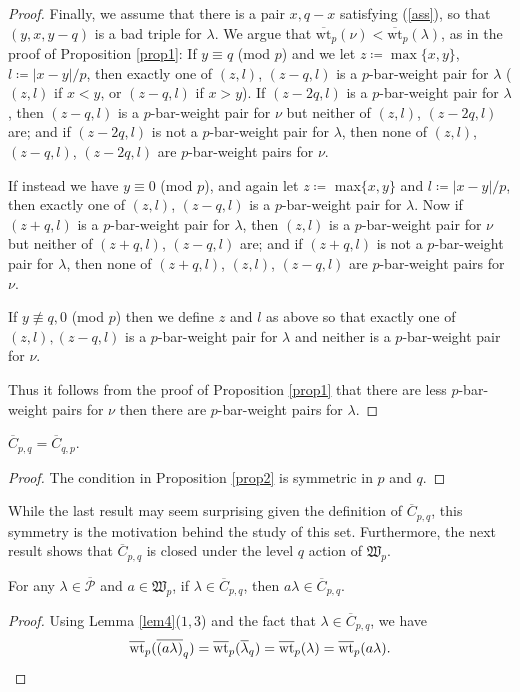 \documentclass[ALCO, Unicode,published]{cedram}
\newcommand*\nicefrac[2]{#1/#2}
\begin{document}
\begin{proof}
Finally, we assume that there is a pair $x,q-x$ satisfying (\ref{ass}), so that $(y,x,y-q)$ is a bad triple for $\lambda$. We argue that $\overline{\text{wt}}_p(\nu)<\overline{\text{wt}}_p(\lambda)$, as in the proof of Proposition \ref{prop1}: \newline
If $y\equiv q$ (mod $p$) and we let $z\coloneqq\max\{x,y\}$, $l\coloneqq\nicefrac{|x-y|}{p}$, then exactly one of $(z,l)$, $(z-q,l)$ is a $p$-bar-weight pair for $\lambda$ ($(z,l)$ if $x<y$, or $(z-q,l)$ if $x>y$). If $(z-2q,l)$ is a $p$-bar-weight pair for $\lambda$, then $(z-q,l)$ is a $p$-bar-weight pair for $\nu$ but neither of $(z,l)$, $(z-2q,l)$ are; and if $(z-2q,l)$ is not a $p$-bar-weight pair for $\lambda$, then none of $(z,l)$, $(z-q,l)$, $(z-2q,l)$ are $p$-bar-weight pairs for $\nu$. 

If instead we have $y\equiv 0$ (mod $p$), and again let $z\coloneqq$ max$\{x,y\}$ and $l\coloneqq\nicefrac{|x-y|}{p}$, then exactly one of $(z,l)$, $(z-q,l)$ is a $p$-bar-weight pair for $\lambda$. Now if $(z+q,l)$ is a $p$-bar-weight pair for $\lambda$, then $(z,l)$ is a $p$-bar-weight pair for $\nu$ but neither of $(z+q,l)$, $(z-q,l)$ are; and if $(z+q,l)$ is not a $p$-bar-weight pair for $\lambda$, then none of $(z+q,l)$, $(z,l)$, $(z-q,l)$ are $p$-bar-weight pairs for $\nu$. 

If $y\not\equiv q,0$ (mod $p$) then we define $z$ and $l$ as above so that exactly one of $(z,l),(z-q,l)$ is a $p$-bar-weight pair for $\lambda$ and neither is a $p$-bar-weight pair for $\nu$. 

Thus it follows from the proof of Proposition \ref{prop1} that there are less $p$-bar-weight pairs for $\nu$ then there are $p$-bar-weight pairs for $\lambda$. 
\end{proof}

\begin{coro}\label{cor2}
$\overline{C}_{p,q}=\overline{C}_{q,p}$. 
\end{coro}
\begin{proof}
The condition in Proposition \ref{prop2} is symmetric in $p$ and $q$.
\end{proof}

While the last result may seem surprising given the definition of $\overline{C}_{p,q}$, this symmetry is the motivation behind the study of this set. Furthermore, the next result shows that $\overline{C}_{p,q}$ is closed under the level $q$ action of $\mathfrak{W}_p$. 

\begin{prop}\label{prop3}
For any $\lambda\in\overline{\mathcal{P}}$ and $a\in\mathfrak{W}_p$, if $\lambda\in\overline{C}_{p,q}$, then $a\lambda\in\overline{C}_{p,q}$. 
\end{prop}
\begin{proof}
Using Lemma \ref{lem4}($1,3$) and the fact that $\lambda\in\overline{C}_{p,q}$, we have 
$$\overline{\text{wt}}_p(\overline{(a\lambda)}_q)=\overline{\text{wt}}_p(\overline{\lambda}_q)=\overline{\text{wt}}_p(\lambda)=\overline{\text{wt}}_p(a\lambda).\qedhere$$ 
\end{proof}
\end{document}
